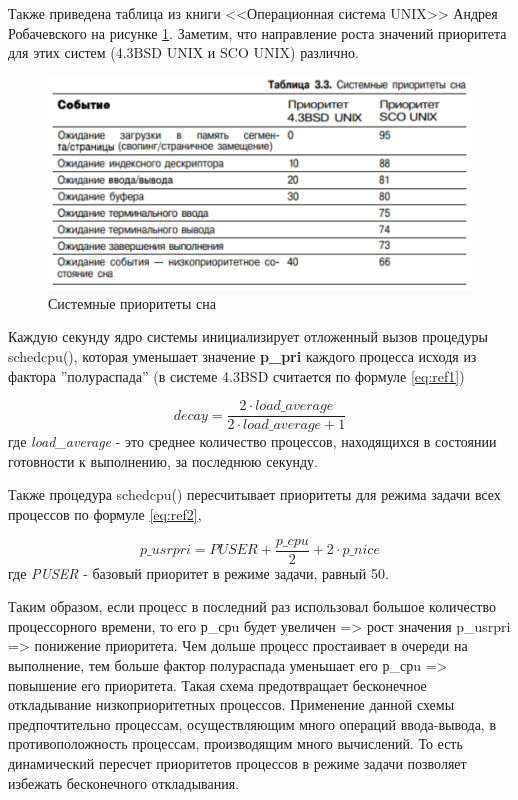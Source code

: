 Также приведена таблица из книги <<Операционная система UNIX>> Андрея Робачевского на рисунке \ref{fig:rob}. Заметим, что направление роста значений приоритета для этих систем (4.3BSD UNIX и SCO UNIX) различно.

\begin{figure}[h!]
	\centering
	\includegraphics[width=0.90\linewidth]{img/sleep.png}
	\caption{Системные приоритеты сна}
	\label{fig:rob}
\end{figure}

\clearpage

Каждую секунду ядро системы инициализирует отложенный вызов процедуры schedcpu(), которая уменьшает значение \textbf{p\_pri} каждого процесса исходя из фактора ''полураспада'' (в системе 4.3BSD считается по формуле \ref{eq:ref1})

\begin{equation}
\label{eq:ref1}
decay = \frac{2 \cdot load\_average}{2 \cdot load\_average + 1}
\end{equation} где
\textit{load\_average} - это среднее количество процессов, находящихся в состоянии готовности к выполнению, за последнюю секунду.

Также процедура schedcpu() пересчитывает приоритеты для режима задачи
всех процессов по формуле \ref{eq:ref2},

\begin{equation}
\label{eq:ref2}
p\_usrpri = PUSER + \frac{p\_cpu}{2} + 2 \cdot p\_nice
\end{equation}где \textit{PUSER} - базовый приоритет в режиме задачи, равный 50.

Таким образом, если процесс в последний раз использовал большое количество процессорного времени, то его р\_срu будет увеличен => рост значения p\_usrpri => понижение приоритета.  Чем дольше процесс простаивает в очереди на выполнение, тем больше фактор полураспада уменьшает его р\_срu => повышение его приоритета. Такая схема предотвращает бесконечное откладывание низкоприоритетных процессов. Применение данной схемы предпочтительно процессам, осуществляющим много операций ввода-вывода, в противоположность процессам, производящим много вычислений. То есть динамический пересчет приоритетов процессов в режиме задачи позволяет избежать бесконечного откладывания.



